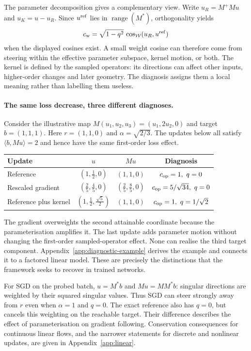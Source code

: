 \documentclass{article}
\DeclareMathOperator{\range}{range}
\theoremstyle{definition}
\theoremstyle{remark}
\begin{document}
The parameter decomposition gives a complementary view. Write $u_R=M^+Mu$ and $u_K=u-u_R$. Since $u^{\rm ref}$ lies in $\range(M^*)$, orthogonality yields
\begin{equation}
 c_{\rm w}=\sqrt{1-q^2}\,\cos_{\mathcal W}(u_R,u^{\rm ref})
 \label{eq:weight-diagnosis}
\end{equation}
when the displayed cosines exist. A small weight cosine can therefore come from steering within the effective parameter subspace, kernel motion, or both. The kernel is defined by the sampled operators: its directions can affect other inputs, higher-order changes and later geometry. The diagnosis assigns them a local meaning rather than labelling them useless.

\paragraph{The same loss decrease, three different diagnoses.}
Consider the illustrative map $M(u_1,u_2,u_3)=(u_1,2u_2,0)$ and target $b=(1,1,1)$. Here $r=(1,1,0)$ and $\alpha=\sqrt{2/3}$. The updates below all satisfy $\langle b,Mu\rangle=2$ and hence have the same first-order loss effect.
\begin{center}\small
\begin{tabular}{lccc}
\toprule
Update & $u$ & $Mu$ & Diagnosis\\
\midrule
Reference & $(1,\tfrac12,0)$ & $(1,1,0)$ & $c_{\rm op}=1,\ q=0$\\
Rescaled gradient & $(\tfrac25,\tfrac45,0)$ & $(\tfrac25,\tfrac85,0)$ & $c_{\rm op}=5/\sqrt{34},\ q=0$\\
Reference plus kernel & $(1,\tfrac12,\tfrac{\sqrt5}{2})$ & $(1,1,0)$ & $c_{\rm op}=1,\ q=1/\sqrt2$\\
\bottomrule
\end{tabular}
\end{center}
The gradient overweights the second attainable coordinate because the parameterisation amplifies it. The last update adds parameter motion without changing the first-order sampled-operator effect. None can realise the third target component. Appendix~\ref{app:diagnostic-example} derives the example and connects it to a factored linear model. These are precisely the distinctions that the framework seeks to recover in trained networks.

For SGD on the probed batch, $u=M^*b$ and $Mu=MM^*b$: singular directions are weighted by their squared singular values. Thus SGD can steer strongly away from $r$ even when $\alpha=1$ and $q=0$. The exact reference also has $q=0$, but cancels this weighting on the reachable target. Their difference describes the effect of parameterisation on gradient following. Conservation consequences for continuous linear flows, and the narrower statements for discrete and nonlinear updates, are given in Appendix~\ref{app:linear}.
\end{document}

